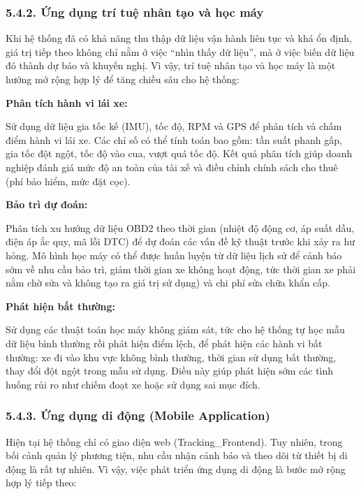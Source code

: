 \documentclass[a4paper]{extarticle}
\begin{document}
\subsubsection{5.4.2. Ứng dụng trí tuệ nhân tạo và học máy}\label{542-ux1ee9ng-dux1ee5ng-truxed-tuux1ec7-nhuxe2n-tux1ea1o-vuxe0-hux1ecdc-muxe1y-aiml}

Khi hệ thống đã có khả năng thu thập dữ liệu vận hành liên tục và khá ổn định,
giá trị tiếp theo không chỉ nằm ở việc ``nhìn thấy dữ liệu'', mà ở việc
biến dữ liệu đó thành dự báo và khuyến nghị. Vì vậy, trí tuệ nhân tạo và học máy là một hướng
mở rộng hợp lý để tăng chiều sâu cho hệ thống:

\textbf{Phân tích hành vi lái xe:}

Sử dụng dữ liệu gia tốc kế (IMU), tốc độ, RPM và GPS để phân tích và
chấm điểm hành vi lái xe. Các chỉ số có thể tính toán bao gồm: tần suất
phanh gấp, gia tốc đột ngột, tốc độ vào cua, vượt quá tốc độ. Kết quả
phân tích giúp doanh nghiệp đánh giá mức độ an toàn của tài xế và điều
chỉnh chính sách cho thuê (phí bảo hiểm, mức đặt cọc).

\textbf{Bảo trì dự đoán:}

Phân tích xu hướng dữ liệu OBD2 theo thời gian (nhiệt độ động cơ, áp
suất dầu, điện áp ắc quy, mã lỗi DTC) để dự đoán các vấn đề kỹ thuật
trước khi xảy ra hư hỏng. Mô hình học máy có thể được huấn luyện từ dữ
liệu lịch sử để cảnh báo sớm về nhu cầu bảo trì, giảm thời gian xe không
hoạt động, tức thời gian xe phải nằm chờ sửa và không tạo ra
giá trị sử dụng) và chi phí sửa chữa khẩn cấp.

\textbf{Phát hiện bất thường:}

Sử dụng các thuật toán học máy không giám sát, tức cho hệ thống tự học mẫu dữ liệu bình thường rồi phát hiện điểm lệch, để
phát hiện các hành vi bất thường: xe đi vào khu vực không bình thường,
thời gian sử dụng bất thường, thay đổi đột ngột trong mẫu sử dụng. Điều
này giúp phát hiện sớm các tình huống rủi ro như chiếm đoạt xe hoặc sử
dụng sai mục đích.

\subsubsection{5.4.3. Ứng dụng di động (Mobile
Application)}\label{543-ux1ee9ng-dux1ee5ng-di-ux111ux1ed9ng-mobile-application}

Hiện tại hệ thống chỉ có giao diện web (Tracking\_Frontend). Tuy nhiên,
trong bối cảnh quản lý phương tiện, nhu cầu nhận cảnh báo và theo dõi từ
thiết bị di động là rất tự nhiên. Vì vậy, việc phát triển ứng dụng di
động là bước mở rộng hợp lý tiếp theo:
\end{document}
